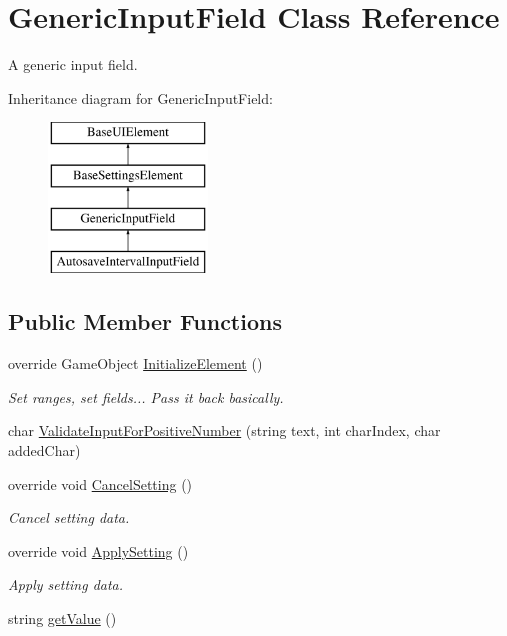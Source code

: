 \hypertarget{class_generic_input_field}{}\section{Generic\+Input\+Field Class Reference}
\label{class_generic_input_field}


A generic input field.  


Inheritance diagram for Generic\+Input\+Field\+:\begin{figure}[H]
\begin{center}
\leavevmode
\includegraphics[height=4.000000cm]{class_generic_input_field}
\end{center}
\end{figure}
\subsection*{Public Member Functions}
\begin{DoxyCompactItemize}
\item 
override Game\+Object \hyperlink{class_generic_input_field_ad85e395f57d5dbf74ae74684c06b06b3}{Initialize\+Element} ()
\begin{DoxyCompactList}\small\item\em Set ranges, set fields... Pass it back basically. \end{DoxyCompactList}\item 
char \hyperlink{class_generic_input_field_a26e2d9ef076892ccb1c37c91ae0f12ea}{Validate\+Input\+For\+Positive\+Number} (string text, int char\+Index, char added\+Char)
\item 
override void \hyperlink{class_generic_input_field_ae3195906f6ed8b00182ba832e43981f6}{Cancel\+Setting} ()
\begin{DoxyCompactList}\small\item\em Cancel setting data. \end{DoxyCompactList}\item 
override void \hyperlink{class_generic_input_field_a97f9b49ecff8b1f6a8c837428c46ef27}{Apply\+Setting} ()
\begin{DoxyCompactList}\small\item\em Apply setting data. \end{DoxyCompactList}\item 
string \hyperlink{class_generic_input_field_acc277b488cc9420e6828735fff6150d1}{get\+Value} ()
\end{DoxyCompactItemize}
